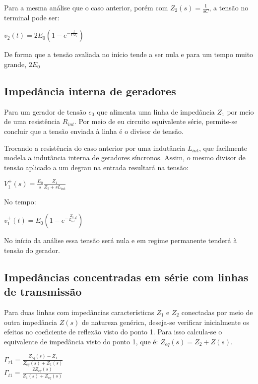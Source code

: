 Para a mesma análise que o caso anterior, porém com $Z_2(s) = \frac{1}{sC}$, a tensão no terminal pode ser:

\begin{center}
    $v_2(t) = 2E_0(1-e^{-\frac{t}{CZ_1}})$
\end{center}

De forma que a tensão avaliada no início tende a ser nula e para um tempo muito grande, $2E_0$

\subsection{Impedância interna de geradores}

Para um gerador de tensão $e_0$ que alimenta uma linha de impedância $Z_1$ por meio de uma resistência $R_{int}$. Por meio de eu circuito equivalente série, permite-se concluir que a tensão enviada à linha é o divisor de tensão.

Trocando a resistência do caso anterior por uma indutância $L_{int}$, que facilmente modela a indutância interna de geradores síncronos. Assim, o mesmo divisor de tensão aplicado a um degrau na entrada resultará na tensão:

\begin{center}
    $V_1^{+}(s) = \frac{E_0}{s} \frac{Z_1}{Z_1+sL_{int}}$
\end{center}

No tempo:

\begin{center}
    $v_1^{+}(t) = E_0(1-e^{-\frac{Z_1}{L_{int}}t})$
\end{center}

No início da análise essa tensão será nula e em regime permanente tenderá à tensão do gerador.

\subsection{Impedâncias concentradas em série com linhas de transmissão}

Para duas linhas com impedâncias características $Z_1$ e $Z_2$ conectadas por meio de outra impedância $Z(s)$ de natureza genérica, deseja-se verificar inicialmente os efeitos no coeficiente de reflexão visto do ponto 1. Para isso calcula-se o equivalente de impedância visto do ponto 1, que é: $Z_{eq}(s) = Z_2+Z(s)$.

\begin{center}
    $\Gamma_{r1} = \frac{Z_{eq}(s)-Z_1}{Z_{eq}(s)+Z_1(s)}$ \\ \vspace{1pt}
    $\Gamma_{t1} = \frac{2Z_{eq}(s)}{Z_1(s)+Z_{eq}(s)}$
\end{center}


